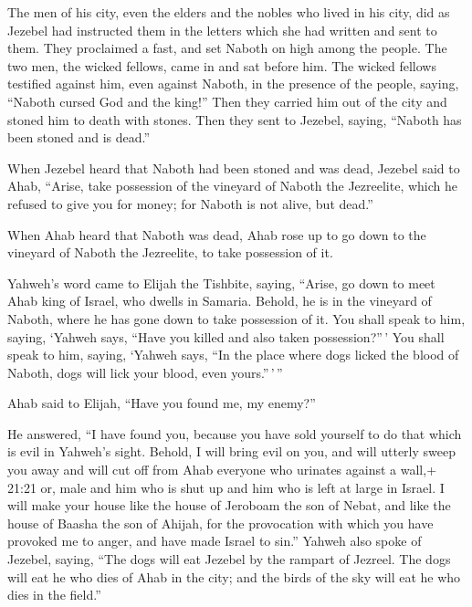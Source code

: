  The men of his city, even the elders and the nobles who
lived in his city, did as Jezebel had instructed them in the letters
which she had written and sent to them.  They proclaimed a
fast, and set Naboth on high among the people.  The two
men, the wicked fellows, came in and sat before him. The wicked fellows
testified against him, even against Naboth, in the presence of the
people, saying, ``Naboth cursed God and the king!'' Then they carried
him out of the city and stoned him to death with stones. 
Then they sent to Jezebel, saying, ``Naboth has been stoned and is
dead.''

 When Jezebel heard that Naboth had been stoned and was
dead, Jezebel said to Ahab, ``Arise, take possession of the vineyard of
Naboth the Jezreelite, which he refused to give you for money; for
Naboth is not alive, but dead.''

 When Ahab heard that Naboth was dead, Ahab rose up to go
down to the vineyard of Naboth the Jezreelite, to take possession of it.

 Yahweh's word came to Elijah the Tishbite, saying,
 ``Arise, go down to meet Ahab king of Israel, who dwells
in Samaria. Behold, he is in the vineyard of Naboth, where he has gone
down to take possession of it.  You shall speak to him,
saying, `Yahweh says, ``Have you killed and also taken possession?''\,'
You shall speak to him, saying, `Yahweh says, ``In the place where dogs
licked the blood of Naboth, dogs will lick your blood, even
yours.''\,'\,''

 Ahab said to Elijah, ``Have you found me, my enemy?''

He answered, ``I have found you, because you have sold yourself to do
that which is evil in Yahweh's sight.  Behold, I will bring
evil on you, and will utterly sweep you away and will cut off from Ahab
everyone who urinates against a wall,+ 21:21 or, male and him who is
shut up and him who is left at large in Israel.  I will
make your house like the house of Jeroboam the son of Nebat, and like
the house of Baasha the son of Ahijah, for the provocation with which
you have provoked me to anger, and have made Israel to sin.''
 Yahweh also spoke of Jezebel, saying, ``The dogs will eat
Jezebel by the rampart of Jezreel.  The dogs will eat he
who dies of Ahab in the city; and the birds of the sky will eat he who
dies in the field.''

